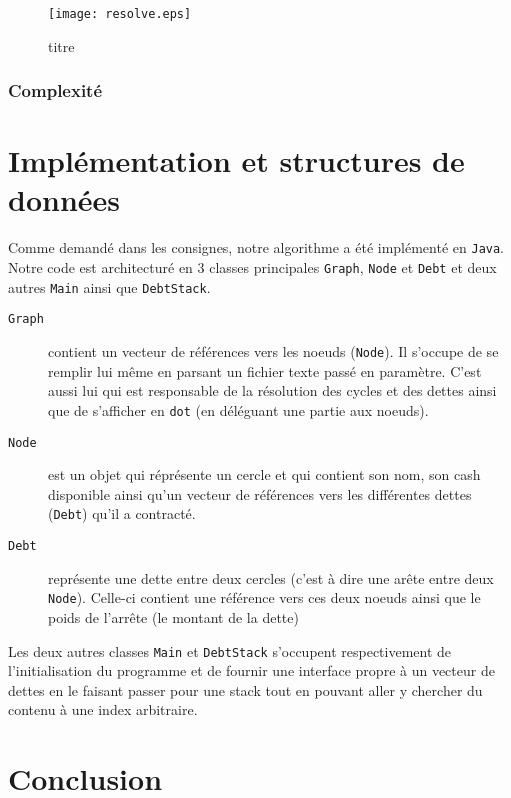 \documentclass[12pt, oneside]{article}
\begin{document}
\begin{figure}[h]
   \caption{\label{resolve} titre}
   \texttt{[image: resolve.eps]}
\end{figure}
\subsubsection{Complexité}

\section{Implémentation et structures de données}
Comme demandé dans les consignes, notre algorithme a été implémenté en \texttt{Java}. Notre code est architecturé en 3 classes principales \texttt{Graph}, \texttt{Node} et \texttt{Debt} et deux autres \texttt{Main} ainsi que \texttt{DebtStack}.

\begin{description}
\item[\texttt{Graph}] contient un vecteur de références vers les noeuds (\texttt{Node}). Il s'occupe de se remplir lui même en parsant un fichier texte passé en paramètre. C'est aussi lui qui est responsable de la résolution des cycles et des dettes ainsi que de s'afficher en \texttt{dot} (en déléguant une partie aux noeuds).
\item[\texttt{Node}] est un objet qui réprésente un cercle et qui contient son nom, son cash disponible ainsi qu'un vecteur de références vers les différentes dettes 
(\texttt{Debt}) qu'il a contracté.
\item[\texttt{Debt}] représente une dette entre deux cercles (c'est à dire une arête entre deux \texttt{Node}). Celle-ci contient une référence vers ces deux noeuds ainsi que le poids de l'arrête (le montant de la dette)
\end{description}
Les deux autres classes \texttt{Main} et \texttt{DebtStack} s'occupent respectivement de l'initialisation du programme et de fournir une interface propre à un vecteur de dettes en le faisant passer pour une stack tout en pouvant aller y chercher du contenu à une index arbitraire.

\section{Conclusion}
\end{document}
